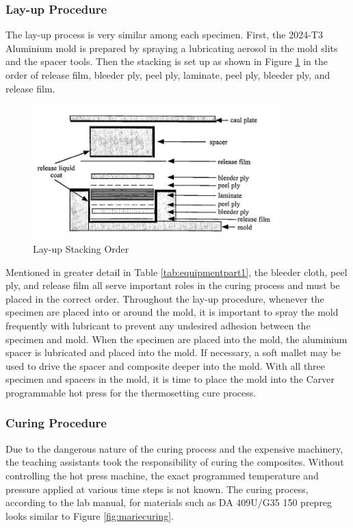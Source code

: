 \subsubsection{Lay-up Procedure}
The lay-up process is very similar among each specimen.  First, the 2024-T3 Aluminium mold is prepared by spraying a lubricating aerosol in the mold slits and the spacer tools.  Then the stacking is set up as shown in Figure \ref{fig:stacking} in the order of release film, bleeder ply, peel ply, laminate, peel ply, bleeder ply, and release film.

\begin{figure}[!h]
    \centering
    \includegraphics[width=0.85\textwidth]{Pictures/Procedure/lay-up.png}
    \caption{Lay-up Stacking Order \cite{labmanual}}
    \label{fig:stacking}
\end{figure}

Mentioned in greater detail in Table \ref{tab:equipmentpart1}, the bleeder cloth, peel ply, and release film all serve important roles in the curing process and must be placed in the correct order.  Throughout the lay-up procedure, whenever the specimen are placed into or around the mold, it is important to spray the mold frequently with lubricant to prevent any undesired adhesion between the specimen and mold.  When the specimen are placed into the mold, the aluminium spacer is lubricated and placed into the mold.  If necessary, a soft mallet may be used to drive the spacer and composite deeper into the mold.  With all three specimen and spacers in the mold, it is time to place the mold into the Carver programmable hot press for the thermosetting cure process.
\clearpage
\subsubsection{Curing Procedure}
Due to the dangerous nature of the curing process and the expensive machinery, the teaching assistants took the responsibility of curing the composites.  Without controlling the hot press machine, the exact programmed temperature and pressure applied at various time steps is not known.  The curing process, according to the lab manual, for materials such as DA 409U/G35 150 prepreg looks similar to Figure \ref{fig:mariecuring}.

